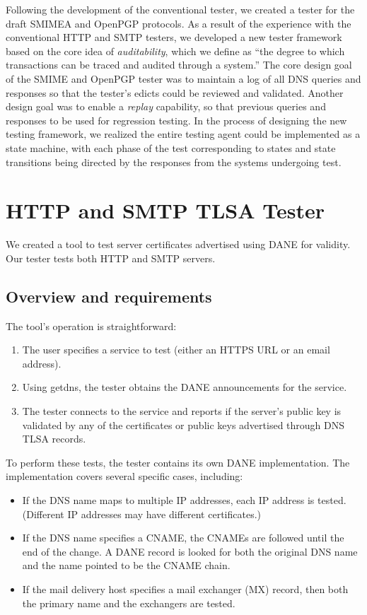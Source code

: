 \documentclass[preprint,5p]{elsarticle}
\begin{document}
Following the development of the conventional tester, we created a
tester for the draft SMIMEA and OpenPGP protocols. As a result of the
experience with the conventional HTTP and SMTP testers, we developed a
new tester framework based on the core idea of \emph{auditability},
which we define as ``the degree to which transactions can be traced
and audited through a system.'' The core design goal of the SMIME and
OpenPGP tester was to maintain a log of all DNS queries and responses
so that the tester's edicts could be reviewed and validated. Another
design goal was to enable a \emph{replay} capability, so that previous
queries and responses to be used for regression testing. In the
process of designing the new testing framework, we realized the entire
testing agent could be implemented as a state machine, with each phase
of the test corresponding to states and state transitions being
directed by the responses from the systems undergoing test.


\section{HTTP and SMTP TLSA Tester}
We created a tool to test server certificates advertised using DANE
for validity. Our tester tests both HTTP and SMTP servers. 

\subsection{Overview and requirements}

The tool's operation is straightforward:

\begin{enumerate}
\item The user specifies a service to test (either an HTTPS URL or an
  email address).
\item Using getdns, the tester obtains the DANE announcements for the
  service. 
\item The tester connects to the service and reports if the server's
  public key is validated by any of the   certificates or public keys
  advertised through DNS TLSA records. 
\end{enumerate}

To perform these tests, the tester contains its own DANE
implementation. The implementation covers several specific cases,
including:

\begin{itemize}
\item If the DNS name maps to multiple IP addresses, each IP address
  is tested. (Different IP addresses may have different certificates.)
\item If the DNS name specifies a CNAME, the CNAMEs are followed until
  the end of the change. A DANE record is looked for both the original
  DNS name and the name pointed to be the CNAME chain.
\item If the mail delivery host specifies a mail exchanger (MX)
  record, then both the primary name and the exchangers are tested.
\end{itemize}
\end{document}
